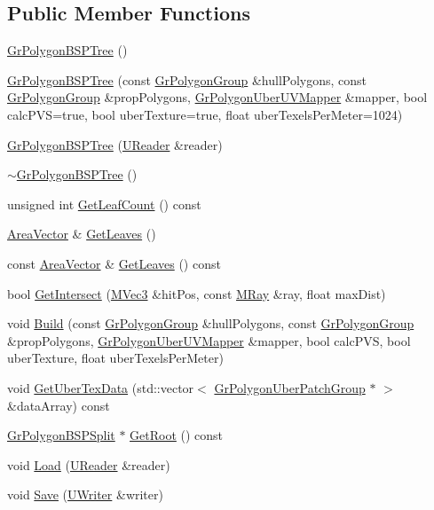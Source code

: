 \subsection*{Public Member Functions}
\begin{CompactItemize}
\item 
\hyperlink{class_gr_polygon_b_s_p_tree_d9c2c1971129708001171e299493cc69}{GrPolygonBSPTree} ()
\item 
\hyperlink{class_gr_polygon_b_s_p_tree_faa29115ffaf59d991ce42734d2369b7}{GrPolygonBSPTree} (const \hyperlink{class_gr_polygon_group}{GrPolygonGroup} \&hullPolygons, const \hyperlink{class_gr_polygon_group}{GrPolygonGroup} \&propPolygons, \hyperlink{class_gr_polygon_uber_u_v_mapper}{GrPolygonUberUVMapper} \&mapper, bool calcPVS=true, bool uberTexture=true, float uberTexelsPerMeter=1024)
\item 
\hyperlink{class_gr_polygon_b_s_p_tree_63d865618b1e83cd5c70bca92a063fbc}{GrPolygonBSPTree} (\hyperlink{class_u_reader}{UReader} \&reader)
\item 
\hyperlink{class_gr_polygon_b_s_p_tree_fe44300f3e1906f765db54da9e7805ce}{$\sim$GrPolygonBSPTree} ()
\item 
unsigned int \hyperlink{class_gr_polygon_b_s_p_tree_dba1e63e49f597a249ed04e04070272f}{GetLeafCount} () const 
\item 
\hyperlink{class_gr_polygon_b_s_p_tree_d2b320fddca0d87a66ba1e091e9fccb9}{AreaVector} \& \hyperlink{class_gr_polygon_b_s_p_tree_1ae0ed62f16e88e6ef4dad79f8486c1a}{GetLeaves} ()
\item 
const \hyperlink{class_gr_polygon_b_s_p_tree_d2b320fddca0d87a66ba1e091e9fccb9}{AreaVector} \& \hyperlink{class_gr_polygon_b_s_p_tree_d836dc6e36f8258c501dfa10de5ec6cc}{GetLeaves} () const 
\item 
bool \hyperlink{class_gr_polygon_b_s_p_tree_ed4a3f944b1bf1bfad2e72a21b9d4787}{GetIntersect} (\hyperlink{class_m_vec3}{MVec3} \&hitPos, const \hyperlink{class_m_ray}{MRay} \&ray, float maxDist)
\item 
void \hyperlink{class_gr_polygon_b_s_p_tree_fdf27337605659e3b54cbbc481cc8dbd}{Build} (const \hyperlink{class_gr_polygon_group}{GrPolygonGroup} \&hullPolygons, const \hyperlink{class_gr_polygon_group}{GrPolygonGroup} \&propPolygons, \hyperlink{class_gr_polygon_uber_u_v_mapper}{GrPolygonUberUVMapper} \&mapper, bool calcPVS, bool uberTexture, float uberTexelsPerMeter)
\item 
void \hyperlink{class_gr_polygon_b_s_p_tree_d184f56f8369b3428e407dc5e38dc768}{GetUberTexData} (std::vector$<$ \hyperlink{class_gr_polygon_uber_patch_group}{GrPolygonUberPatchGroup} $\ast$ $>$ \&dataArray) const 
\item 
\hyperlink{class_gr_polygon_b_s_p_split}{GrPolygonBSPSplit} $\ast$ \hyperlink{class_gr_polygon_b_s_p_tree_8bc067621d02d771088344934dfa134f}{GetRoot} () const 
\item 
void \hyperlink{class_gr_polygon_b_s_p_tree_37da90c4a80a5f8889b9754024a3307f}{Load} (\hyperlink{class_u_reader}{UReader} \&reader)
\item 
void \hyperlink{class_gr_polygon_b_s_p_tree_a819e2036225a94ce82987e8f34b160f}{Save} (\hyperlink{class_u_writer}{UWriter} \&writer)
\end{CompactItemize}


